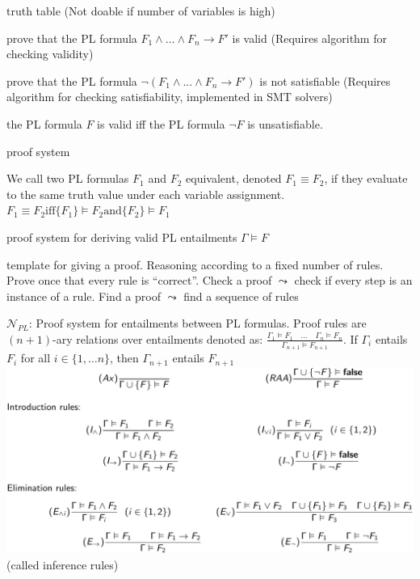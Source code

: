 \documentclass[landscape, a4paper]{article}
\begin{document}
\begin{minipage}[t]{0.2\linewidth}
\begin{betterlist}
		\begin{betterlist}
			\item truth table (Not doable if number of variables is high)
			\item prove that the PL formula $F_1 \land \ldots \land F_n \rightarrow F'$ is valid (Requires algorithm for checking validity)
			\item prove that the PL formula $\neg(F_1 \land . . . \land F_n \rightarrow F')$ is not satisfiable (Requires algorithm for checking satisfiability, implemented in SMT solvers)
			\begin{betterlist}
				\item the PL formula $F$ is valid iff the PL formula $\neg F$ is unsatisfiable. 
			\end{betterlist}
			\item proof system
		\end{betterlist}
		\item We call two PL formulas $F_1$ and $F_2$ \alert{equivalent}, denoted $F_1 \equiv F_2$, if they evaluate to the same truth value under each variable assignment. $F_1 \equiv F_2 \text{iff} \{F_1\} \models F_2 \text{and} \{F_2\} \models F_1$
	\end{betterlist}
	\fbox{PL Proof system ($N_{PL}$)}
	\begin{betterlist}
		\item proof system for deriving valid PL entailments $\Gamma \models F$
		\item template for giving a proof. Reasoning according to a fixed number of rules. Prove once that every rule is \enquote{correct}. Check a proof $\leadsto$ check if every step is an instance of a rule. Find a proof $\leadsto$ find a sequence of rules
		\item $\mathcal{N}_{PL}$: Proof system for entailments between PL formulas. Proof rules are $(n + 1)$-ary relations over entailments denoted as: $\frac{\Gamma_1 \vDash F_1 \quad \ldots \quad \Gamma_n \vDash F_n}{\Gamma_{n+1} \vDash F_{n+1}}$.  If $\Gamma_i$ entails $F_i$ for all $i \in \{1, \ldots n\}$, then $\Gamma_{n+1}$ entails $F_{n+1}$
		\includegraphics[width=0.7\linewidth]{./figures/proof_rules.png}  (called inference rules)

\end{betterlist}
\end{minipage}
\end{document}
